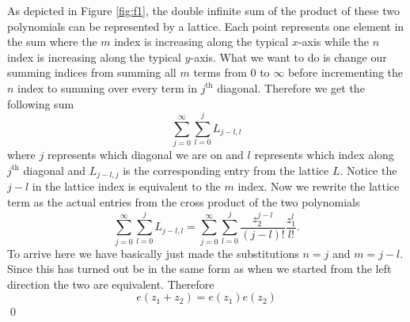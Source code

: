 \documentclass[10pt]{amsart}
\theoremstyle{nonumberplain}
\begin{document}
\begin{enumerate}[label={\bf {\arabic*}:}]
As depicted in Figure \ref{fig:f1}, the double infinite sum of the product of these two polynomials can be represented by a lattice.
Each point represents one element in the sum where the $m$ index is increasing along the typical $x$-axis while the $n$ index is increasing along the typical $y$-axis.
What we want to do is change our summing indices from summing all $m$ terms from $0$ to $\infty$ before incrementing the $n$ index to summing over every term in $j^\text{th}$ diagonal.
Therefore we get the following sum
$$\sum_{j=0}^{\infty} \sum_{l = 0}^{j} L_{j-l, l}$$
where $j$ represents which diagonal we are on and $l$ represents which index along $j^{\text{th}}$ diagonal and $L_{j-l, j}$ is the corresponding entry from the lattice $L$.
Notice the $j-l$ in the lattice index is equivalent to the $m$ index.
Now we rewrite the lattice term as the actual entries from the cross product of the two polynomials
$$\sum_{j=0}^{\infty} \sum_{l = 0}^{j} L_{j-l, l} = \sum_{j=0}^{\infty} \sum_{l = 0}^{j} \frac{z_2^{j-l}}{(j - l)!} \frac{z_1^{l}}{l!}. $$
To arrive here we have basically just made the substitutions $n = j$ and $m = j - l$.
Since this has turned out be in the same form as when we started from the left direction the two are equivalent.
Therefore
$$ e\left(z_1+z_2\right)=e\left(z_1\right) e\left(z_2\right) $$
\qed
  

\end{enumerate}
\end{document}
